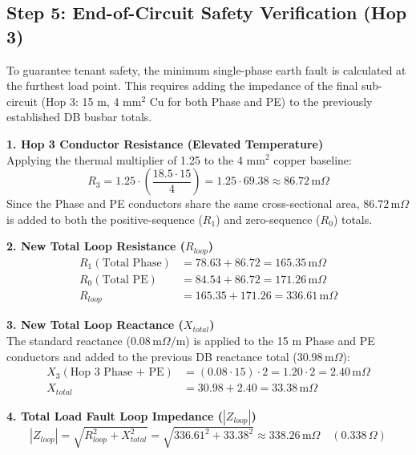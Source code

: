\documentclass[11pt, a4paper]{article}
\begin{document}
\subsection{Step 5: End-of-Circuit Safety Verification (Hop 3)}
To guarantee tenant safety, the minimum single-phase earth fault is calculated at the furthest load point. This requires adding the impedance of the final sub-circuit (Hop 3: 15 m, 4 mm$^2$ Cu for both Phase and PE) to the previously established DB busbar totals.

\noindent \textbf{1. Hop 3 Conductor Resistance (Elevated Temperature)} \\
Applying the thermal multiplier of 1.25 to the 4 mm$^2$ copper baseline:
\begin{equation}
    R_3 = 1.25 \cdot \left( \frac{18.5 \cdot 15}{4} \right) = 1.25 \cdot 69.38 \approx 86.72 \, \text{m}\Omega
\end{equation}
Since the Phase and PE conductors share the same cross-sectional area, $86.72 \, \text{m}\Omega$ is added to both the positive-sequence ($R_1$) and zero-sequence ($R_0$) totals.

\noindent \textbf{2. New Total Loop Resistance ($R_{loop}$)}
\begin{align}
    R_1 (\text{Total Phase}) &= 78.63 + 86.72 = 165.35 \, \text{m}\Omega \\
    R_0 (\text{Total PE}) &= 84.54 + 86.72 = 171.26 \, \text{m}\Omega \\
    R_{loop} &= 165.35 + 171.26 = 336.61 \, \text{m}\Omega
\end{align}

\noindent \textbf{3. New Total Loop Reactance ($X_{total}$)} \\
The standard reactance ($0.08 \, \text{m}\Omega/\text{m}$) is applied to the 15 m Phase and PE conductors and added to the previous DB reactance total ($30.98 \, \text{m}\Omega$):
\begin{align}
    X_3 (\text{Hop 3 Phase + PE}) &= (0.08 \cdot 15) \cdot 2 = 1.20 \cdot 2 = 2.40 \, \text{m}\Omega \\
    X_{total} &= 30.98 + 2.40 = 33.38 \, \text{m}\Omega
\end{align}

\noindent \textbf{4. Total Load Fault Loop Impedance ($|Z_{loop}|$)}
\begin{equation}
    |Z_{loop}| = \sqrt{R_{loop}^2 + X_{total}^2} = \sqrt{336.61^2 + 33.38^2} \approx 338.26 \, \text{m}\Omega \quad (0.338 \, \Omega)
\end{equation}
\end{document}

